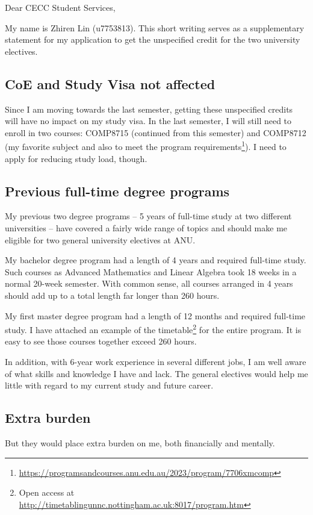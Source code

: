 \documentclass[12pt,a4paper]{article}
\begin{document}
Dear CECC Student Services,

My name is Zhiren Lin (u7753813).  This short writing serves as a supplementary statement for my application to get the unspecified credit for the two university electives.

\subsection*{CoE and Study Visa not affected}
Since I am moving towards the last semester, getting these unspecified credits will have no impact on my study visa.  In the last semester, I will still need to enroll in two courses: COMP8715 (continued from this semester) and COMP8712 (my favorite subject and also to meet the program requirements\footnote{\url{https://programsandcourses.anu.edu.au/2023/program/7706xmcomp}}). I need to apply for reducing study load, though.


\subsection*{Previous full-time degree programs}
My previous two degree programs -- 5 years of full-time study at two different universities -- have covered a fairly wide range of topics and should make me eligible for two general university electives at ANU.

My bachelor degree program had a length of 4 years and required full-time study.  Such courses as Advanced Mathematics and Linear Algebra took 18 weeks in a normal 20-week semester. With common sense, all courses arranged in 4 years should add up to a total length far longer than 260 hours.

My first master degree program had a length of 12 months and required full-time study.  I have attached an example of the timetable\footnote{Open access at \url{http://timetablingunnc.nottingham.ac.uk:8017/program.htm}} for the entire program.  It is easy to see those courses together exceed 260 hours.

In addition, with 6-year work experience in several different jobs,  I am well aware of what skills and knowledge I have and lack.  The general electives would help me little with regard to my current study and future career.

\subsection*{Extra burden}
But they would place extra burden on me, both financially and mentally.
\end{document}
